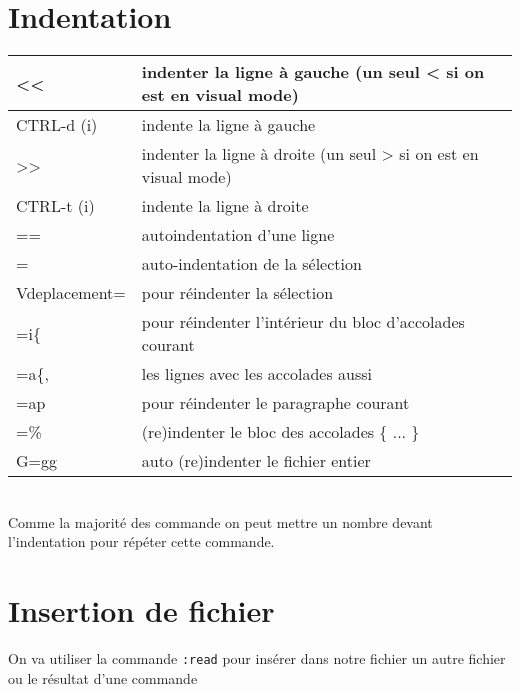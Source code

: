 \documentclass{article}
\begin{document}
                    \section{Indentation}
                    \begin{tabular}{|p{3cm}| l| }
                        \hline
                        << & indenter la ligne à gauche (un seul < si on est en visual mode)\\ \hline
                        CTRL-d  (i) & indente la ligne à gauche \\ \hline
                        >> & indenter la ligne à droite (un seul > si on est en visual mode)\\ \hline
                        CTRL-t  (i) & indente la ligne à droite \\ \hline
                        == & autoindentation d'une ligne\\ \hline
                        = & auto-indentation de la sélection\\ \hline
                        V{deplacement}= & pour réindenter la sélection\\ \hline
                        =i\{ & pour réindenter l'intérieur du bloc d'accolades courant\\ \hline
                        =a\{, & les lignes avec les accolades aussi\\ \hline
                        =ap & pour réindenter le paragraphe courant\\ \hline
                        =\% & (re)indenter le bloc des accolades \{ ... \} \\ \hline
                        G=gg   & auto (re)indenter le fichier entier \\ \hline
                    \end{tabular}\\

                    Comme la majorité des commande on peut mettre un nombre devant l'indentation pour répéter cette commande.

                            \section{Insertion de fichier}
                            On va utiliser la commande \verb?:read? pour insérer dans notre fichier un autre fichier ou le résultat d'une commande\\
\end{document}
